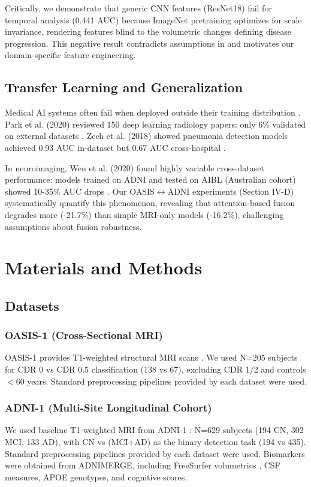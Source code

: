 \documentclass[conference]{IEEEtran}
\begin{document}
Critically, we demonstrate that generic CNN features (ResNet18) fail for temporal analysis (0.441 AUC) because ImageNet pretraining optimizes for scale invariance, rendering features blind to the volumetric changes defining disease progression. This negative result contradicts assumptions in \cite{Spasov2019, Kwak2022} and motivates our domain-specific feature engineering.

\subsection{Transfer Learning and Generalization}

Medical AI systems often fail when deployed outside their training distribution \cite{Zech2018}. Park et al. (2020) reviewed 150 deep learning radiology papers: only 6\% validated on external datasets \cite{Park2020}. Zech et al. (2018) showed pneumonia detection models achieved 0.93 AUC in-dataset but 0.67 AUC cross-hospital \cite{Zech2018}.

In neuroimaging, Wen et al. (2020) found highly variable cross-dataset performance: models trained on ADNI and tested on AIBL (Australian cohort) showed 10-35\% AUC drops \cite{Wen2020}. Our OASIS$\leftrightarrow$ADNI experiments (Section IV-D) systematically quantify this phenomenon, revealing that attention-based fusion degrades more (-21.7\%) than simple MRI-only models (-16.2\%), challenging assumptions about fusion robustness.

\section{Materials and Methods}

\subsection{Datasets}

\subsubsection{OASIS-1 (Cross-Sectional MRI)}
OASIS-1 provides T1-weighted structural MRI scans \cite{Marcus2007}. We used N=205 subjects for CDR 0 vs CDR 0.5 classification (138 vs 67), excluding CDR 1/2 and controls $<$60 years. Standard preprocessing pipelines provided by each dataset were used.

\subsubsection{ADNI-1 (Multi-Site Longitudinal Cohort)}
We used baseline T1-weighted MRI from ADNI-1 \cite{Mueller2005}: N=629 subjects (194 CN, 302 MCI, 133 AD), with CN vs (MCI+AD) as the binary detection task (194 vs 435). Standard preprocessing pipelines provided by each dataset were used. Biomarkers were obtained from ADNIMERGE, including FreeSurfer volumetrics \cite{Fischl2012}, CSF measures, APOE genotypes, and cognitive scores.
\end{document}

